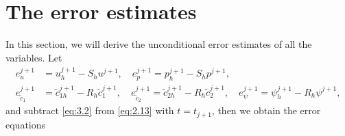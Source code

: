 \documentclass[a4paper,fleqn]{cas-sc}
\numberwithin{equation}{section}
\theoremstyle{definition}
\begin{document}
\section{The error estimates}\label{sec:error}

In this section, we will derive the unconditional error estimates of all the variables. Let
\begin{equation}\label{eq:4.1}
\begin{aligned}
  e_{u}^{j+1}       &= u_{h}^{j+1} - S_{h}u^{j+1}, \quad
  e_{p}^{j+1}        = p_{h}^{j+1} - S_{h}p^{j+1}, \\
  e_{\tilde{c}_{1}}^{j+1} &= \tilde{c}_{1h}^{j+1} - R_{h}\tilde{c}_{1}^{j+1}, \quad
  e_{\tilde{c}_{2}}^{j+1}  = \tilde{c}_{2h}^{j+1} - R_{h}\tilde{c}_{2}^{j+1}, \quad
  e_{\psi}^{j+1}     = \psi_{h}^{j+1} - R_{h}\psi^{j+1},
\end{aligned}
\end{equation}
and subtract \eqref{eq:3.2} from \eqref{eq:2.13} with $t = t_{j+1}$, then we obtain the error equations
\end{document}
